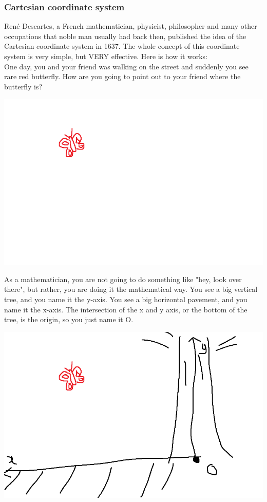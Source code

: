 \documentclass[12pt]{article}
\begin{document}
\subsubsection*{Cartesian coordinate system}
René Descartes, a French mathematician, physicist, philosopher and many other occupations that noble man usually had back then, published the idea of the Cartesian coordinate system in 1637. The whole concept of this coordinate system is very simple, but VERY effective. Here is how it works:\\
One day, you and your friend was walking on the street and suddenly you see rare red butterfly. How are you going to point out to your friend where the butterfly is?
\begin{center}
\includegraphics[scale=0.5]{1}
\end{center}
As a mathematician, you are not going to do something like "hey, look over there", but rather, you are doing it the mathematical way. You see a big vertical tree, and you name it the y-axis. You see a big horizontal pavement, and you name it the x-axis. The intersection of the x and y axis, or the bottom of the tree, is the origin, so you just name it O.\\
\begin{center}
\includegraphics[scale=0.5]{2}
\end{center}
\end{document}
